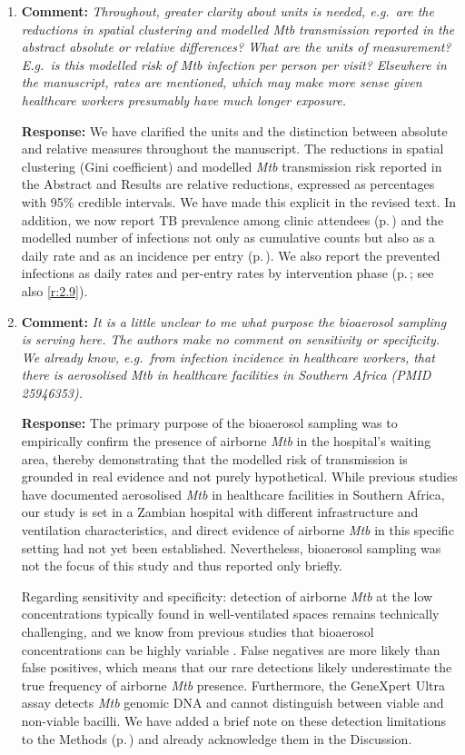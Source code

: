 \documentclass[11pt]{article}
\newcommand{\comment}[1]{\textbf{Comment:} \textit{#1}}
\newcommand{\response}[1]{\textbf{Response:} #1}
\begin{document}
\begin{enumerate}[label=\textbf{R2.\arabic*.}, leftmargin=*]
\item\label{r:2.15} \comment{Throughout, greater clarity about units is needed, e.g.\ are the reductions in spatial clustering and modelled \emph{Mtb} transmission reported in the abstract absolute or relative differences? What are the units of measurement? E.g.\ is this modelled risk of \emph{Mtb} infection per person per visit? Elsewhere in the manuscript, rates are mentioned, which may make more sense given healthcare workers presumably have much longer exposure.}

\response{We have clarified the units and the distinction between absolute and relative measures throughout the manuscript. The reductions in spatial clustering (Gini coefficient) and modelled \emph{Mtb} transmission risk reported in the Abstract and Results are relative reductions, expressed as percentages with 95\% credible intervals. We have made this explicit in the revised text. In addition, we now report TB prevalence among clinic attendees (p.\,\pageref{chg:R2.15prev}) and the modelled number of infections not only as cumulative counts but also as a daily rate and as an incidence per entry (p.\,\pageref{chg:R2.15rate}). We also report the prevented infections as daily rates and per-entry rates by intervention phase (p.\,\pageref{chg:R2.9rates}; see also \ref{r:2.9}).}

\item\label{r:2.16} \comment{It is a little unclear to me what purpose the bioaerosol sampling is serving here. The authors make no comment on sensitivity or specificity. We already know, e.g.\ from infection incidence in healthcare workers, that there is aerosolised \emph{Mtb} in healthcare facilities in Southern Africa (PMID 25946353).}

\response{The primary purpose of the bioaerosol sampling was to empirically confirm the presence of airborne \emph{Mtb} in the hospital's waiting area, thereby demonstrating that the modelled risk of transmission is grounded in real evidence and not purely hypothetical. While previous studies have documented aerosolised \emph{Mtb} in healthcare facilities in Southern Africa, our study is set in a Zambian hospital with different infrastructure and ventilation characteristics, and direct evidence of airborne \emph{Mtb} in this specific setting had not yet been established. Nevertheless, bioaerosol sampling was not the focus of this study and thus reported only briefly.

Regarding sensitivity and specificity: detection of airborne \emph{Mtb} at the low concentrations typically found in well-ventilated spaces remains technically challenging, and we know from previous studies that bioaerosol concentrations can be highly variable \citep{banholzer2025IntJInfectDis}. False negatives are more likely than false positives, which means that our rare detections likely underestimate the true frequency of airborne \emph{Mtb} presence. Furthermore, the GeneXpert Ultra assay detects \emph{Mtb} genomic DNA and cannot distinguish between viable and non-viable bacilli. We have added a brief note on these detection limitations to the Methods (p.\,\pageref{chg:R2.16}) and already acknowledge them in the Discussion.}


\end{enumerate}
\end{document}
